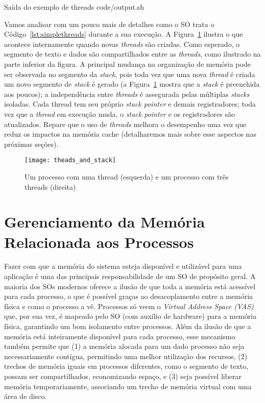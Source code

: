 \begin{ruledcaption}{Saída do exemplo de threads\label{lst:simpleThreadOutput}}
 {code/output.sh}
\end{ruledcaption}

Vamos analisar com um pouco mais de detalhes como o SO trata o
Código~\ref{lst:simplethreads} durante a sua execução. A
Figura~\ref{fig:stack_threads} ilustra o que acontece internamente quando novas
\emph{threads} são criadas. Como esperado, o segmento de texto e dados são
compartilhados entre as \emph{threads}, como ilustrado na parte inferior da
figura. A principal mudança na organização de memória pode ser observada no
segmento da \emph{stack}, pois toda vez que uma nova \emph{thread} é criada um
novo segmento de \emph{stack} é gerado (a Figura~\ref{fig:stack_threads} mostra
que a \emph{stack} é preenchida aos poucos); a independência entre
\emph{threads} é assegurada pelas múltiplas \emph{stacks} isoladas. Cada thread
tem seu próprio \emph{stack pointer} e demais registradores; toda vez que a
\emph{thread} em execução muda, o \emph{stack pointer} e os registradores são
atualizados. Repare que o uso de \emph{threads} melhora o desempenho uma vez
que reduz os impactos na memória cache (detalharemos mais sobre esse aspectos
nas próximas seções).

\begin{figure}[!h]
  \centering
  \texttt{[image: theads\_and\_stack]} 
  \caption{Um processo com uma thread (esquerda) e um processo com três threads (direita)}
  \label{fig:stack_threads} 
\end{figure}

\section{Gerenciamento da Memória Relacionada aos Processos}

Fazer com que a memória do sistema esteja disponível e utilizável para uma
aplicação é uma das principais responsabilidade de um SO de propósito geral. A
maioria dos SOs modernos oferece a ilusão de que toda a memória está acessível
para cada processo, o que é possível graças ao desacoplamento entre a memória
física e como o processo a vê. Processos só veem o \emph{Virtual Address Space
(VAS)} que, por sua vez, é mapeado pelo SO (com auxílio de hardware) para a
memória física, garantindo um bom isolamento entre processos. Além da ilusão de
que a memória está inteiramente disponível para cada processo, esse mecanismo
também permite que (1) a memória alocada para um dado processo não seja
necessariamente contígua, permitindo uma melhor utilização dos recursos, (2)
trechos de memória iguais em processos diferentes, como o segmento de texto,
possam ser compartilhados, economizando espaço, e (3) seja possível liberar
memória temporariamente, associando um trecho de memória virtual com uma área
de disco.

